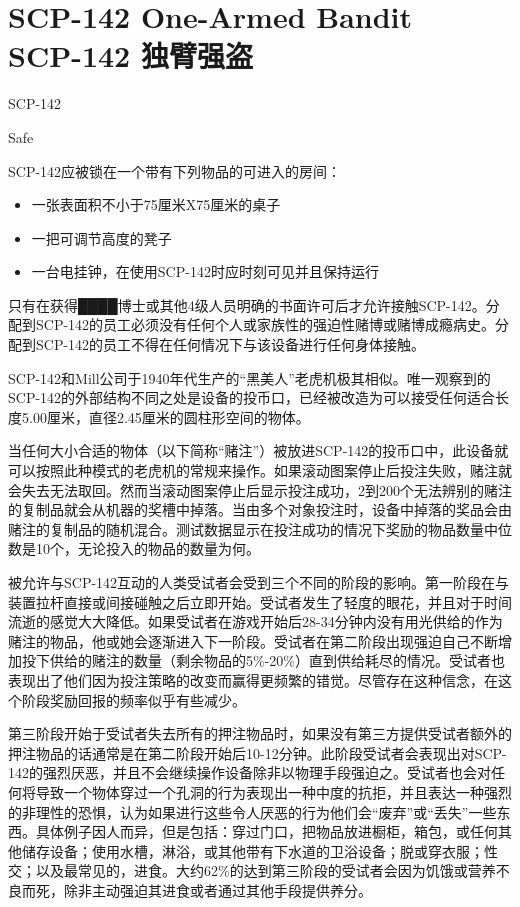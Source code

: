 \chapter[SCP-142 独臂强盗]{
    SCP-142 One-Armed Bandit\\
    SCP-142 独臂强盗
}

\label{chap:SCP-142}

SCP-142

Safe

SCP-142应被锁在一个带有下列物品的可进入的房间：

\begin{itemize}
	\item 一张表面积不小于75厘米X75厘米的桌子
	\item 一把可调节高度的凳子
	\item 一台电挂钟，在使用SCP-142时应时刻可见并且保持运行
\end{itemize}

只有在获得████博士或其他4级人员明确的书面许可后才允许接触SCP-142。分配到SCP-142的员工必须没有任何个人或家族性的强迫性赌博或赌博成瘾病史。分配到SCP-142的员工不得在任何情况下与该设备进行任何身体接触。

SCP-142和Mill公司于1940年代生产的“黑美人”老虎机极其相似。唯一观察到的SCP-142的外部结构不同之处是设备的投币口，已经被改造为可以接受任何适合长度5.00厘米，直径2.45厘米的圆柱形空间的物体。

当任何大小合适的物体（以下简称“赌注”）被放进SCP-142的投币口中，此设备就可以按照此种模式的老虎机的常规来操作。如果滚动图案停止后投注失败，赌注就会失去无法取回。然而当滚动图案停止后显示投注成功，2到200个无法辨别的赌注的复制品就会从机器的奖槽中掉落。当由多个对象投注时，设备中掉落的奖品会由赌注的复制品的随机混合。测试数据显示在投注成功的情况下奖励的物品数量中位数是10个，无论投入的物品的数量为何。

被允许与SCP-142互动的人类受试者会受到三个不同的阶段的影响。第一阶段在与装置拉杆直接或间接碰触之后立即开始。受试者发生了轻度的眼花，并且对于时间流逝的感觉大大降低。如果受试者在游戏开始后28-34分钟内没有用光供给的作为赌注的物品，他或她会逐渐进入下一阶段。受试者在第二阶段出现强迫自己不断增加投下供给的赌注的数量（剩余物品的5\%-20\%）直到供给耗尽的情况。受试者也表现出了他们因为投注策略的改变而赢得更频繁的错觉。尽管存在这种信念，在这个阶段奖励回报的频率似乎有些减少。

第三阶段开始于受试者失去所有的押注物品时，如果没有第三方提供受试者额外的押注物品的话通常是在第二阶段开始后10-12分钟。此阶段受试者会表现出对SCP-142的强烈厌恶，并且不会继续操作设备除非以物理手段强迫之。受试者也会对任何将导致一个物体穿过一个孔洞的行为表现出一种中度的抗拒，并且表达一种强烈的非理性的恐惧，认为如果进行这些令人厌恶的行为他们会“废弃”或“丢失”一些东西。具体例子因人而异，但是包括：穿过门口，把物品放进橱柜，箱包，或任何其他储存设备；使用水槽，淋浴，或其他带有下水道的卫浴设备；脱或穿衣服；性交；以及最常见的，进食。大约62\%的达到第三阶段的受试者会因为饥饿或营养不良而死，除非主动强迫其进食或者通过其他手段提供养分。

